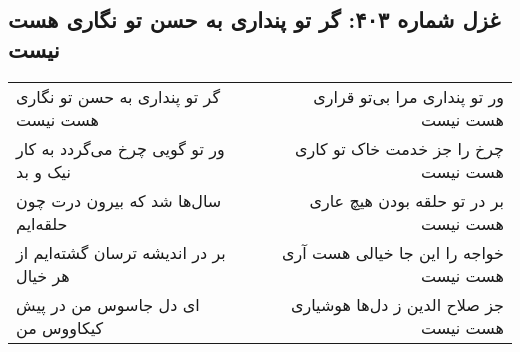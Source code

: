 \begin{center}
\section*{غزل شماره ۴۰۳: گر تو پنداری به حسن تو نگاری هست نیست}
\label{sec:0403}
\begin{longtable}{l p{0.5cm} r}
گر تو پنداری به حسن تو نگاری هست نیست
&&
ور تو پنداری مرا بی‌تو قراری هست نیست
\\
ور تو گویی چرخ می‌گردد به کار نیک و بد
&&
چرخ را جز خدمت خاک تو کاری هست نیست
\\
سال‌ها شد که بیرون درت چون حلقه‌ایم
&&
بر در تو حلقه بودن هیچ عاری هست نیست
\\
بر در اندیشه ترسان گشته‌ایم از هر خیال
&&
خواجه را این جا خیالی هست آری هست نیست
\\
ای دل جاسوس من در پیش کیکاووس من
&&
جز صلاح الدین ز دل‌ها هوشیاری هست نیست
\\
\end{longtable}
\end{center}

